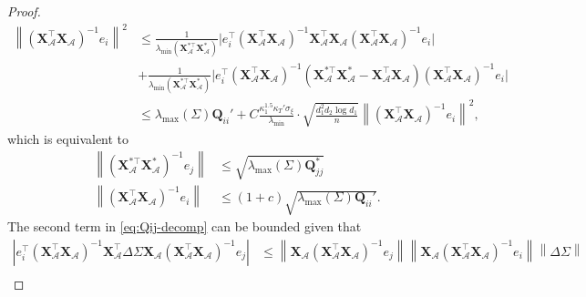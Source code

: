 \documentclass[12pt]{article}
\newcommand{\abs}[1]{\left\lvert#1\right\rvert}
\newcommand{\norm}[1]{\left\lVert#1\right\rVert}
\theoremstyle{plain}
\begin{document}
\begin{proof}
\begin{equation*}
\begin{aligned}
      \norm{\left(\mathbf{X}_{\mathcal{A}}^{\top} \mathbf{X}_{\mathcal{A}}\right)^{-1}e_i}^2 & \le \frac{1}{\lambda_{\min}\left(\mathbf{X}_{\mathcal{A}}^{*\top} \mathbf{X}_{\mathcal{A}}^*\right)  } \big| e^\top_i \left(\mathbf{X}_{\mathcal{A}}^{\top} \mathbf{X}_{\mathcal{A}}\right)^{-1}\mathbf{X}_{\mathcal{A}}^{\top} \mathbf{X}_{\mathcal{A}}\left(\mathbf{X}_{\mathcal{A}}^{\top} \mathbf{X}_{\mathcal{A}}\right)^{-1}e_i \big|  \\
      & + \frac{1}{\lambda_{\min}\left(\mathbf{X}_{\mathcal{A}}^{*\top} \mathbf{X}_{\mathcal{A}}^*\right)  } \big| e^\top_i \left(\mathbf{X}_{\mathcal{A}}^{\top} \mathbf{X}_{\mathcal{A}}\right)^{-1}\left( \mathbf{X}_{\mathcal{A}}^{*\top} \mathbf{X}_{\mathcal{A}}^* - \mathbf{X}_{\mathcal{A}}^{\top} \mathbf{X}_{\mathcal{A}}\right) \left(\mathbf{X}_{\mathcal{A}}^{\top} \mathbf{X}_{\mathcal{A}}\right)^{-1}e_i \big| \\
      & \le \lambda_{\max}(\Sigma) \mathbf{Q}_{ii}'+ C\frac{\kappa_1^{1.5} \kappa_T'  \sigma_{\xi} }{ \lambda_{\min}  }\cdot \sqrt{\frac{ d_1^2 d_2 \log d_1}{n}}\norm{\left(\mathbf{X}_{\mathcal{A}}^{\top} \mathbf{X}_{\mathcal{A}}\right)^{-1}e_i}^2,
\end{aligned}
\end{equation*}
which is equivalent to 
\begin{equation*}
    \begin{aligned}
       \norm{\left(\mathbf{X}_{\mathcal{A}}^{*\top} \mathbf{X}_{\mathcal{A}}^*\right)^{-1}e_j} &\le \sqrt{\lambda_{\max}(\Sigma) \mathbf{Q}_{jj}^*}\\
      \norm{\left(\mathbf{X}_{\mathcal{A}}^{\top} \mathbf{X}_{\mathcal{A}}\right)^{-1}e_i} &\le (1+c)\sqrt{\lambda_{\max}(\Sigma) \mathbf{Q}_{ii}'}.
    \end{aligned}
\end{equation*}
The second term in \eqref{eq:Qij-decomp} can be bounded given that
\begin{equation*}
    \begin{aligned}
      \abs{e_i^\top \left(\mathbf{X}_{\mathcal{A}}^{\top} \mathbf{X}_{\mathcal{A}}\right)^{-1}\mathbf{X}_{\mathcal{A}}^{\top} \Delta \Sigma \mathbf{X}_{\mathcal{A}}\left(\mathbf{X}_{\mathcal{A}}^{\top} \mathbf{X}_{\mathcal{A}}\right)^{-1}e_j} &\le \norm{\mathbf{X}_{\mathcal{A}}\left(\mathbf{X}_{\mathcal{A}}^{\top} \mathbf{X}_{\mathcal{A}}\right)^{-1}e_j} \norm{\mathbf{X}_{\mathcal{A}}\left(\mathbf{X}_{\mathcal{A}}^{\top} \mathbf{X}_{\mathcal{A}}\right)^{-1}e_i} \norm{\Delta \Sigma} \\

\end{aligned}
\end{equation*}
\end{proof}
\end{document}
